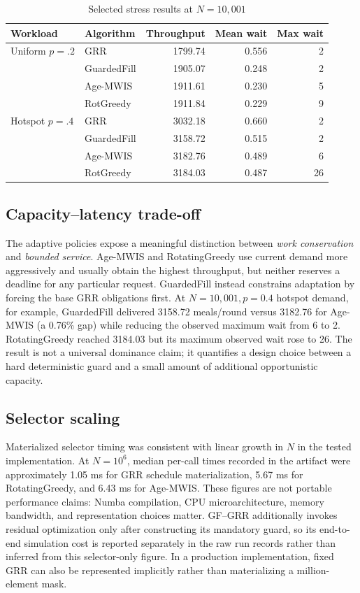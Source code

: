 \documentclass[10pt,journal]{IEEEtran}
\begin{document}
\begin{table}[t]
\centering
\caption{Selected stress results at $N=10{,}001$}
\label{tab:stress}
\footnotesize
\setlength{\tabcolsep}{3.2pt}
\begin{tabular}{llrrr}
\toprule
Workload & Algorithm & Throughput & Mean wait & Max wait\\
\midrule
Uniform $p=.2$ & GRR & 1799.74 & 0.556 & 2\\
 & GuardedFill & 1905.07 & 0.248 & 2\\
 & Age-MWIS & 1911.61 & 0.230 & 5\\
 & RotGreedy & 1911.84 & 0.229 & 9\\
\midrule
Hotspot $p=.4$ & GRR & 3032.18 & 0.660 & 2\\
 & GuardedFill & 3158.72 & 0.515 & 2\\
 & Age-MWIS & 3182.76 & 0.489 & 6\\
 & RotGreedy & 3184.03 & 0.487 & 26\\
\bottomrule
\end{tabular}
\end{table}

\subsection{Capacity--latency trade-off}
The adaptive policies expose a meaningful distinction between \emph{work conservation} and \emph{bounded service}. Age-MWIS and RotatingGreedy use current demand more aggressively and usually obtain the highest throughput, but neither reserves a deadline for any particular request. GuardedFill instead constrains adaptation by forcing the base GRR obligations first. At $N=10{,}001,p=0.4$ hotspot demand, for example, GuardedFill delivered 3158.72 meals/round versus 3182.76 for Age-MWIS (a 0.76\% gap) while reducing the observed maximum wait from 6 to 2. RotatingGreedy reached 3184.03 but its maximum observed wait rose to 26. The result is not a universal dominance claim; it quantifies a design choice between a hard deterministic guard and a small amount of additional opportunistic capacity.

\subsection{Selector scaling}
Materialized selector timing was consistent with linear growth in $N$ in the tested implementation. At $N=10^6$, median per-call times recorded in the artifact were approximately 1.05 ms for GRR schedule materialization, 5.67 ms for RotatingGreedy, and 6.43 ms for Age-MWIS. These figures are not portable performance claims: Numba compilation, CPU microarchitecture, memory bandwidth, and representation choices matter. GF--GRR additionally invokes residual optimization only after constructing its mandatory guard, so its end-to-end simulation cost is reported separately in the raw run records rather than inferred from this selector-only figure. In a production implementation, fixed GRR can also be represented implicitly rather than materializing a million-element mask.
\end{document}
